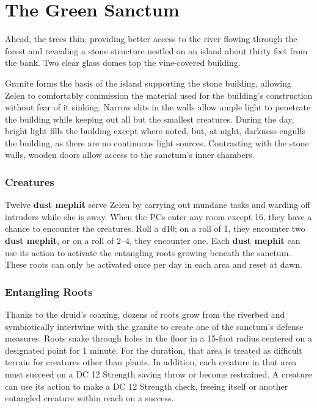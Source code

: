 \documentclass[10pt,a4paper,twoside,bg=print,twocolumn,openany,nodeprecatedcode]{dndbook}
\begin{document}
\section{The Green Sanctum}
\begin{DndReadAloud}{}
Ahead, the trees thin, providing better access to the river flowing through the forest and revealing a stone structure nestled on an island about thirty feet from the bank. Two clear glass domes top the vine-covered building.

\end{DndReadAloud}

Granite forms the basis of the island supporting the stone building, allowing Zelen to comfortably commission the material used for the building's construction without fear of it sinking. Narrow slits in the walls allow ample light to penetrate the building while keeping out all but the smallest creatures. During the day, bright light fills the building except where noted, but, at night, darkness engulfs the building, as there are no continuous light sources. Contrasting with the stone walls, wooden doors allow access to the sanctum's inner chambers.

\subsubsection{Creatures}
Twelve \textbf{dust mephit} serve Zelen by carrying out mundane tasks and warding off intruders while she is away. When the PCs enter any room except 16, they have a chance to encounter the creatures. Roll a d10; on a roll of 1, they encounter two \textbf{dust mephit}, or on a roll of 2–4, they encounter one. Each \textbf{dust mephit} can use its action to activate the entangling roots growing beneath the sanctum. These roots can only be activated once per day in each area and reset at dawn.

\subsubsection{Entangling Roots}
Thanks to the druid's coaxing, dozens of roots grow from the riverbed and symbiotically intertwine with the granite to create one of the sanctum's defense measures. Roots snake through holes in the floor in a 15-foot radius centered on a designated point for 1 minute. For the duration, that area is treated as difficult terrain for creatures other than plants. In addition, each creature in that area must succeed on a DC 12 Strength saving throw or become restrained. A creature can use its action to make a DC 12 Strength check, freeing itself or another entangled creature within reach on a success.
\end{document}
